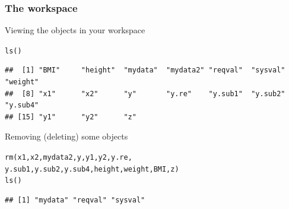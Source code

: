 \documentclass[color=usenames,dvipsnames]{beamer}\usepackage[]{graphicx}\usepackage[]{color}
\makeatletter
\newcommand{\hlstd}[1]{\textcolor[rgb]{0,0,0}{#1}}%
\newcommand{\hlkwd}[1]{\textcolor[rgb]{0.004,0.004,0.506}{#1}}%
\newenvironment{kframe}{%
 \def\at@end@of@kframe{}%
 \ifinner\ifhmode%
  \def\at@end@of@kframe{\end{minipage}}%
  \begin{minipage}{\columnwidth}%
 \fi\fi%
 \def\FrameCommand##1{\hskip\@totalleftmargin \hskip-\fboxsep
 \colorbox{shadecolor}{##1}\hskip-\fboxsep
     \hskip-\linewidth \hskip-\@totalleftmargin \hskip\columnwidth}%
 \MakeFramed {\advance\hsize-\width
   \@totalleftmargin\z@ \linewidth\hsize
   \@setminipage}}%
 {\par\unskip\endMakeFramed%
 \at@end@of@kframe}
\newenvironment{knitrout}{}{} %
\makeatother
\begin{document}
\begin{frame}[fragile]
  \frametitle{The workspace}
  Viewing the objects in your workspace
\begin{knitrout}\scriptsize
{}\color{fgcolor}\begin{kframe}
\begin{alltt}
\hlkwd{ls}\hlstd{()}
\end{alltt}
\begin{verbatim}
##  [1] "BMI"     "height"  "mydata"  "mydata2" "reqval"  "sysval"  "weight" 
##  [8] "x1"      "x2"      "y"       "y.re"    "y.sub1"  "y.sub2"  "y.sub4" 
## [15] "y1"      "y2"      "z"
\end{verbatim}
\end{kframe}
\end{knitrout}
\pause \vfill
Removing (deleting) some objects
\begin{knitrout}\scriptsize
{}\color{fgcolor}\begin{kframe}
\begin{alltt}
\hlkwd{rm}\hlstd{(x1, x2, mydata2, y, y1, y2, y.re,}
   \hlstd{y.sub1, y.sub2, y.sub4, height, weight, BMI, z)}
\hlkwd{ls}\hlstd{()}
\end{alltt}
\begin{verbatim}
## [1] "mydata" "reqval" "sysval"
\end{verbatim}
\end{kframe}
\end{knitrout}
\end{frame}
\end{document}
